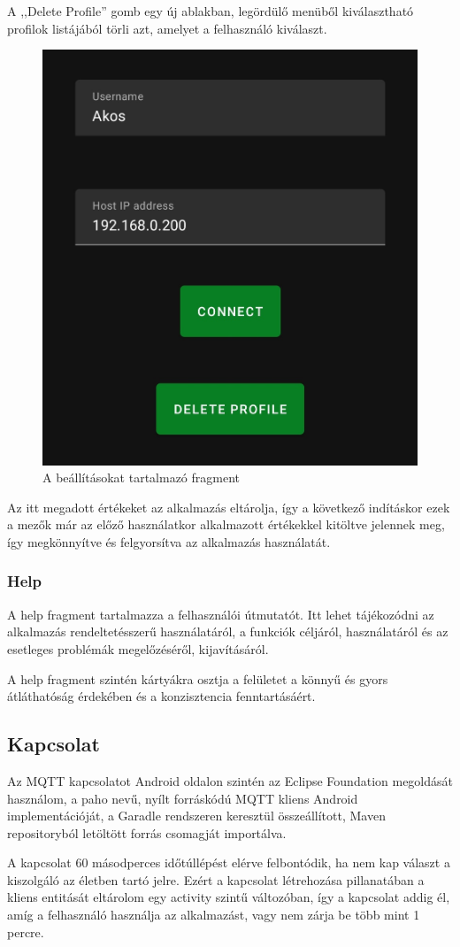 \documentclass[
]{thesis-ekf}
\theoremstyle{definition}
\theoremstyle{remark}
\begin{document}
A ,,Delete Profile'' gomb egy új ablakban, legördülő menüből kiválasztható profilok listájából törli azt, amelyet a
felhasználó kiválaszt.
\begin{figure}[H]
	\centering
	\includegraphics[width=0.5\linewidth]{images/connect.jpg}
	\caption{A beállításokat tartalmazó fragment}
\end{figure}

Az itt megadott értékeket az alkalmazás eltárolja, így a következő indításkor ezek a mezők már az előző használatkor
alkalmazott értékekkel kitöltve jelennek meg, így megkönnyítve és felgyorsítva az alkalmazás használatát.

\subsubsection{Help}
A help fragment tartalmazza a felhasználói útmutatót. Itt lehet tájékozódni az alkalmazás rendeltetésszerű használatáról,
a funkciók céljáról, használatáról és az esetleges problémák megelőzéséről, kijavításáról.

A help fragment szintén kártyákra osztja a felületet a könnyű és gyors átláthatóság érdekében és a
konzisztencia fenntartásáért.

\subsection{Kapcsolat}
Az MQTT kapcsolatot Android oldalon szintén az Eclipse Foundation megoldását használom, a paho\cite{paho} nevű,
nyílt forráskódú MQTT kliens Android implementációját, a Garadle rendszeren keresztül összeállított,
Maven repositoryból letöltött forrás csomagját importálva.

A kapcsolat 60 másodperces időtúllépést elérve felbontódik, ha nem kap választ a kiszolgáló az életben tartó
jelre. Ezért a kapcsolat létrehozása pillanatában a kliens entitását eltárolom egy activity szintű változóban,
így a kapcsolat addig él, amíg a felhasználó használja az alkalmazást, vagy nem zárja be több mint 1 percre.
\end{document}
